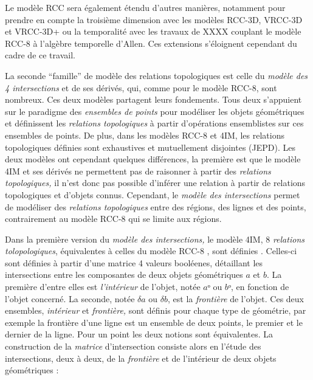 Le modèle RCC sera également étendu d'autres manières, notamment pour
prendre en compte la troisième dimension avec les modèles RCC-3D,
VRCC-3D et VRCC-3D+ ou la temporalité avec les travaux de XXXX
couplant le modèle RCC-8 à l'algèbre temporelle d'Allen. Ces
extensions s'éloignent cependant du cadre de ce travail.

La seconde \enquote{famille} de modèle des relations topologiques est
celle du \emph{modèle des 4 intersections}
\autocite[4IM,][]{Egenhofer1989} et de ses dérivés, qui, comme pour le
modèle RCC-8, sont nombreux. Ces deux modèles partagent leurs
fondements. Tous deux s’appuient sur le paradigme des \emph{ensembles
  de points} pour modéliser les objets géométriques et définissent les
\emph{relations topologiques} à partir d'opérations ensemblistes sur
ces ensembles de points. De plus, dans les modèles RCC-8
\autocite{Randell1992} et 4IM, les relations topologiques définies
sont exhaustives et mutuellement disjointes (JEPD). Les deux modèles
ont cependant quelques différences, la première est que le modèle 4IM
et ses dérivés ne permettent pas de raisonner à partir des
\emph{relations topologiques,} il n'est donc pas possible d'inférer
une relation à partir de relations topologiques et d'objets
connus. Cependant, le \emph{modèle des intersections} permet de
modéliser des \emph{relations topologiques} entre des régions, des
lignes et des points, contrairement au modèle RCC-8 qui se limite aux
régions.

Dans la première version du \emph{modèle des intersections,} le modèle
4IM, 8 \emph{relations tolopologiques}, équivalentes à celles du
modèle RCC-8 \autocite{Duchene2019}, sont définies
\textcite{Egenhofer1989,Egenhofer1990,Egenhofer1991a}. Celles-ci sont
définies à partir d'une matrice 4 valeurs booléenes, détaillant les
intersections entre les composantes de deux objets géométriques \(a\)
et \(b\). La première d'entre elles est \emph{l'intérieur} de l'objet,
notée \(aᵒ\) ou \(bᵒ\), en fonction de l'objet concerné. La seconde,
notée \(δa\) ou \(δb\), est la \emph{frontière} de l'objet. Ces deux
ensembles, \emph{intérieur} et \emph{frontière,} sont définis pour
chaque type de géométrie, par exemple la frontière d'une ligne est un
ensemble de deux points, le premier et le dernier de la ligne. Pour un
point les deux notions sont équivalentes. La construction de la
\emph{matrice }d'intersection consiste alors en l'étude des
intersections, deux à deux, de la \emph{frontière} et de l'intérieur
de deux objets géométriques :


